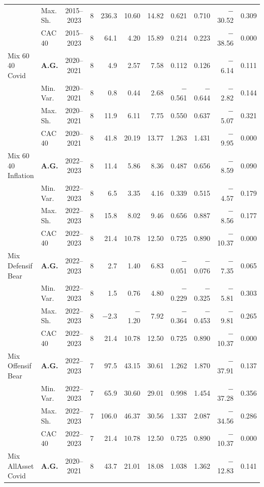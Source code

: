\begin{longtable}{p{2.6cm} l c c r r r r r r r}
 & Max.\,Sh. & 2015--2023 & 8 & 236.3 & 10.60 & 14.82 & 0.621 & 0.710 & $-$30.52 & 0.309 \\
 & CAC 40 & 2015--2023 & 8 & 64.1 & 4.20 & 15.89 & 0.214 & 0.223 & $-$38.56 & 0.000 \\
\midrule
Mix 60 40 Covid & \textbf{A.G.} & 2020--2021 & 8 & 4.9 & 2.57 & 7.58 & 0.112 & 0.126 & $-$6.14 & 0.111 \\
 & Min.\,Var. & 2020--2021 & 8 & 0.8 & 0.44 & 2.68 & $-$0.561 & $-$0.644 & $-$2.82 & 0.144 \\
 & Max.\,Sh. & 2020--2021 & 8 & 11.9 & 6.11 & 7.75 & 0.550 & 0.637 & $-$5.07 & 0.321 \\
 & CAC 40 & 2020--2021 & 8 & 41.8 & 20.19 & 13.77 & 1.263 & 1.431 & $-$9.95 & 0.000 \\
\midrule
Mix 60 40 Inflation & \textbf{A.G.} & 2022--2023 & 8 & 11.4 & 5.86 & 8.36 & 0.487 & 0.656 & $-$8.59 & 0.090 \\
 & Min.\,Var. & 2022--2023 & 8 & 6.5 & 3.35 & 4.16 & 0.339 & 0.515 & $-$4.57 & 0.179 \\
 & Max.\,Sh. & 2022--2023 & 8 & 15.8 & 8.02 & 9.46 & 0.656 & 0.887 & $-$8.56 & 0.177 \\
 & CAC 40 & 2022--2023 & 8 & 21.4 & 10.78 & 12.50 & 0.725 & 0.890 & $-$10.37 & 0.000 \\
\midrule
Mix Defensif Bear & \textbf{A.G.} & 2022--2023 & 8 & 2.7 & 1.40 & 6.83 & $-$0.051 & $-$0.076 & $-$7.35 & 0.065 \\
 & Min.\,Var. & 2022--2023 & 8 & 1.5 & 0.76 & 4.80 & $-$0.229 & $-$0.325 & $-$5.81 & 0.303 \\
 & Max.\,Sh. & 2022--2023 & 8 & $-$2.3 & $-$1.20 & 7.92 & $-$0.364 & $-$0.453 & $-$9.81 & 0.265 \\
 & CAC 40 & 2022--2023 & 8 & 21.4 & 10.78 & 12.50 & 0.725 & 0.890 & $-$10.37 & 0.000 \\
\midrule
Mix Offensif Bear & \textbf{A.G.} & 2022--2023 & 7 & 97.5 & 43.15 & 30.61 & 1.262 & 1.870 & $-$37.91 & 0.137 \\
 & Min.\,Var. & 2022--2023 & 7 & 65.9 & 30.60 & 29.01 & 0.998 & 1.454 & $-$37.28 & 0.356 \\
 & Max.\,Sh. & 2022--2023 & 7 & 106.0 & 46.37 & 30.56 & 1.337 & 2.087 & $-$34.56 & 0.286 \\
 & CAC 40 & 2022--2023 & 7 & 21.4 & 10.78 & 12.50 & 0.725 & 0.890 & $-$10.37 & 0.000 \\
\midrule
Mix AllAsset Covid & \textbf{A.G.} & 2020--2021 & 8 & 43.7 & 21.01 & 18.08 & 1.038 & 1.362 & $-$12.83 & 0.141 \\

\end{longtable}
